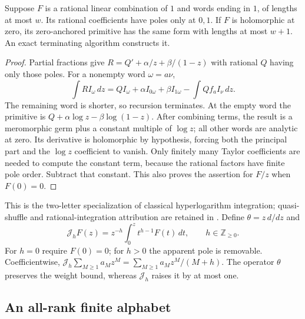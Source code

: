 \begin{lemma}\label{rha:hermite}
Suppose $F$ is a rational linear combination of $1$ and words ending
in $1$, of lengths at most $w$. Its rational coefficients have poles
only at $0,1$. If $F$ is holomorphic at zero, its zero-anchored
primitive has the same form with lengths at most $w+1$.
An exact terminating algorithm constructs it.
\end{lemma}
\begin{proof}
Partial fractions give $R=Q'+\alpha/z+\beta/(1-z)$ with rational $Q$
having only those poles. For a nonempty word $\omega=a\nu$,
\[
 \int R I_\omega\,dz=Q I_\omega+\alpha I_{0\omega}
       +\beta I_{1\omega}-\int Q f_a I_\nu\,dz.
\]
The remaining word is shorter, so recursion terminates. At the empty
word the primitive is $Q+\alpha\log z-\beta\log(1-z)$.
After combining terms, the result is a meromorphic germ plus a constant
multiple of $\log z$; all other words are analytic at zero.
Its derivative is holomorphic by hypothesis, forcing both the principal
part and the $\log z$ coefficient to vanish. Only finitely many Taylor
coefficients are needed to compute the constant term, because the
rational factors have finite pole order. Subtract that constant.
This also proves the assertion for $F/z$ when $F(0)=0$.
\end{proof}

This is the two-letter specialization of classical hyperlogarithm
integration; quasi-shuffle and rational-integration attribution are
retained in \cite{rha:reports}. Define $\theta=z\,d/dz$ and
\begin{equation}\label{rha:inverse}
 \mathcal J_hF(z)=z^{-h}\int_0^z t^{h-1}F(t)\,dt,
                \qquad h\in\mathbb Z_{\ge0}.
\end{equation}
For $h=0$ require $F(0)=0$; for $h>0$ the apparent pole is removable.
Coefficientwise, $\mathcal J_h\sum_{M\ge1}a_Mz^M
=\sum_{M\ge1}a_Mz^M/(M+h)$. The operator $\theta$ preserves the
weight bound, whereas $\mathcal J_h$ raises it by at most one.

\subsection{An all-rank finite alphabet}

